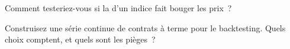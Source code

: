 \begin{interviewq}\label{iq:m3:forward-curves-storage-and-convenience-yield:5}
Comment testeriez-vous si la  d'un indice fait bouger les prix~?
\end{interviewq}

\begin{interviewq}\label{iq:m3:forward-curves-storage-and-convenience-yield:6}
Construisez une série continue de contrats à terme pour le backtesting. Quels choix comptent, et quels sont les pièges~?
\end{interviewq}
